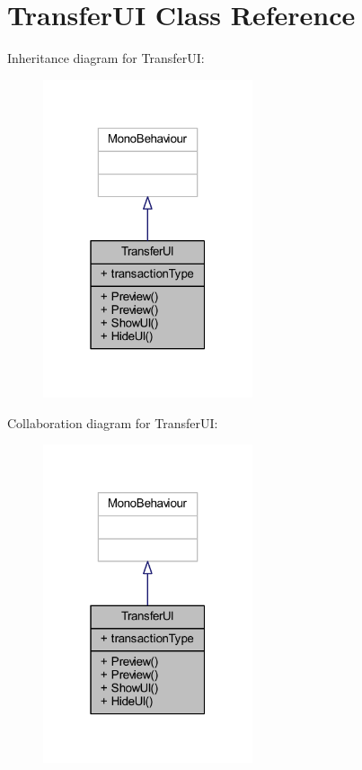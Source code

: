 \hypertarget{class_transfer_u_i}{}\section{Transfer\+UI Class Reference}
\label{class_transfer_u_i}


Inheritance diagram for Transfer\+UI\+:
\nopagebreak
\begin{figure}[H]
\begin{center}
\leavevmode
\includegraphics[width=175pt]{class_transfer_u_i__inherit__graph}
\end{center}
\end{figure}


Collaboration diagram for Transfer\+UI\+:
\nopagebreak
\begin{figure}[H]
\begin{center}
\leavevmode
\includegraphics[width=175pt]{class_transfer_u_i__coll__graph}
\end{center}
\end{figure}
